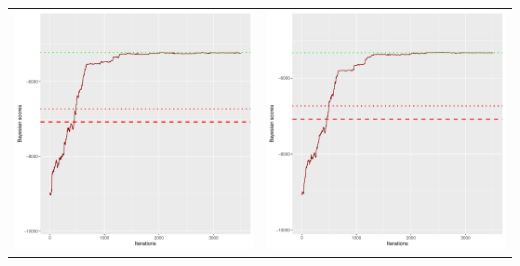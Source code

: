 \documentclass[]{scrartcl}
\begin{document}
\begin{table}[h!]
\begin{tabular}{cc}
\includegraphics[scale = 0.4]{./figs/alarm/v4/30/bayBoundsEvolution-3502.pdf} & 
\includegraphics[scale = 0.4]{./figs/alarm/v4/50/bayBoundsEvolution-3502.pdf} \\

\end{tabular}
\end{table}
\end{document}
